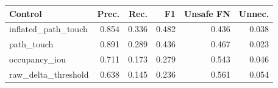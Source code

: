\begin{tabular}{lrrrrr}
\toprule
Control & Prec. & Rec. & F1 & Unsafe FN & Unnec. \\
\midrule
inflated\_path\_touch & 0.854 & 0.336 & 0.482 & 0.436 & 0.038 \\
path\_touch & 0.891 & 0.289 & 0.436 & 0.467 & 0.023 \\
occupancy\_iou & 0.711 & 0.173 & 0.279 & 0.543 & 0.046 \\
raw\_delta\_threshold & 0.638 & 0.145 & 0.236 & 0.561 & 0.054 \\
\bottomrule
\end{tabular}

